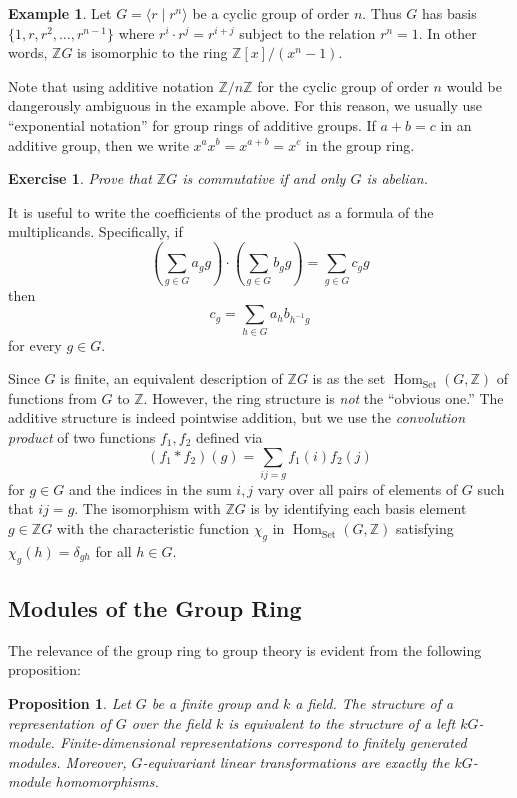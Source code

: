 \documentclass[12pt]{article}
\theoremstyle{plain}
\newtheorem{proposition}[theorem]{Proposition}
\newtheorem{exercise}[theorem]{Exercise}
\theoremstyle{definition}
\newtheorem{example}[theorem]{Example}
\theoremstyle{remark}
\numberwithin{equation}{section}
\begin{document}
\begin{example}
Let $G = \langle r \mid r^n \rangle$ be a cyclic group of order $n$.
Thus $G$ has basis $\{1,r,r^2,\ldots, r^{n-1} \}$
where $r^i\cdot r^j=r^{i+j}$ subject to the relation $r^n=1$.
In other words, $\mathbb{Z}G$ is isomorphic to the ring
$\mathbb{Z}[x]/(x^n-1)$.
\end{example}

Note that using additive notation $\mathbb{Z}/n\mathbb{Z}$
for the cyclic group of order $n$ would be dangerously
ambiguous in the example above.
For this reason, we usually use ``exponential notation''
for group rings of additive groups.
If $a+b=c$ in an additive group, then
we write $x^ax^b=x^{a+b}=x^c$ in the group ring.

\begin{exercise}
Prove that $\mathbb{Z}G$ is commutative if and only $G$ is abelian.
\end{exercise}

It is useful to write the coefficients of the product as a formula of
the multiplicands.  Specifically, if
\[
\left( \sum_{g \in G} a_g g \right) \cdot
\left( \sum_{g \in G} b_g g \right)
= \sum_{g \in G} c_g g
\]
then
\[
c_g = \sum_{h \in G} a_hb_{h^{-1}g}
\]
for every $g \in G$.

Since $G$ is finite, an equivalent description of $\mathbb{Z}G$ is as the set
$\operatorname{Hom}_{\mathrm{Set}}(G,\mathbb{Z})$
of functions from $G$ to $\mathbb{Z}$.
However, the ring structure is \emph{not} the ``obvious one.''
The additive structure is indeed pointwise addition,
but we use the \emph{convolution product}
of two functions $f_1,f_2$ defined via
\[
(f_1 \ast f_2)(g) = \sum_{ij=g} f_1(i)f_2(j)
\]
for $g \in G$ and the indices in the sum $i,j$
vary over all pairs of elements of $G$ such that $ij=g$.
The isomorphism with $\mathbb{Z}G$ is by identifying each basis element
$g \in \mathbb{Z}G$ with the characteristic function $\chi_g$
in $\operatorname{Hom}_{\mathrm{Set}}(G,\mathbb{Z})$
satisfying $\chi_g(h) = \delta_{gh}$ for all $h \in G$.

\subsection{Modules of the Group Ring}

The relevance of the group ring to group theory is evident from the
following proposition:

\begin{proposition} \label{prop:equivalence}
Let $G$ be a finite group and $k$ a field.
The structure of a representation of $G$ over the field $k$
is equivalent to the structure of a left $kG$-module.
Finite-dimensional representations correspond to
finitely generated modules.
Moreover, $G$-equivariant linear transformations are
exactly the $kG$-module homomorphisms.
\end{proposition}
\end{document}
